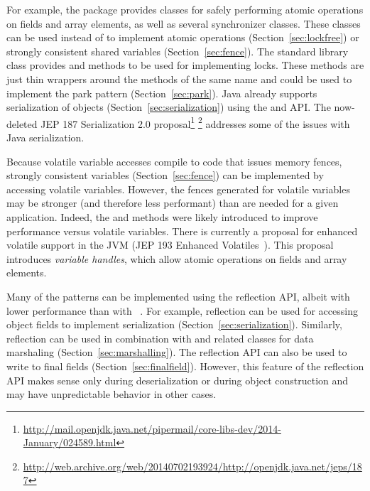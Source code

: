 For example,
the  package provides classes 
for safely performing atomic operations on fields and array elements, as well
as several synchronizer classes. These
classes
can be used instead of \unsafe{} to implement
atomic operations (Section~\ref{sec:lockfree}) or strongly consistent
shared variables (Section~\ref{sec:fence}).
The standard library class
 provides
 and 
methods to be used for implementing locks. 
These methods are just thin wrappers
around the \smu{} methods of the same name and 
could be used to implement the park pattern (Section~\ref{sec:park}).
Java already supports serialization of objects
(Section~\ref{sec:serialization}) using the
 and
 API.
The now-deleted JEP 187 Serialization 2.0 proposal\footnote{\url{http://mail.openjdk.java.net/pipermail/core-libs-dev/2014-January/024589.html}}
\footnote{\url{http://web.archive.org/web/20140702193924/http://openjdk.java.net/jeps/187}}
addresses some of the issues with Java serialization.

Because volatile variable accesses compile to code that issues memory fences, 
strongly consistent variables (Section~\ref{sec:fence}) can be implemented by accessing volatile variables.
However, the fences generated for volatile variables may be stronger (and
therefore less performant) than are
needed for a given application. Indeed, the \unsafe{} 
and  methods were likely introduced
to improve performance versus volatile variables. There is currently a proposal
for enhanced volatile support in the JVM
(JEP 193 Enhanced Volatiles~\cite{jep193}).
This proposal introduces \emph{variable handles}, which allow
atomic operations on fields and array elements.

Many of the patterns can be implemented using the reflection API, albeit
with lower performance than with \unsafe{}~\cite{Korl_noninvasiveconcurrency}.
For example,
reflection can be used for accessing object fields to implement serialization
(Section~\ref{sec:serialization}).
Similarly, reflection can be used
in combination with
 and related classes for
data marshaling (Section~\ref{sec:marshalling}).
The reflection API can also be used to write to final fields
(Section~\ref{sec:finalfield}).
However, this feature of the reflection API 
makes sense only during deserialization or during object construction and may have
unpredictable behavior in other
cases.

